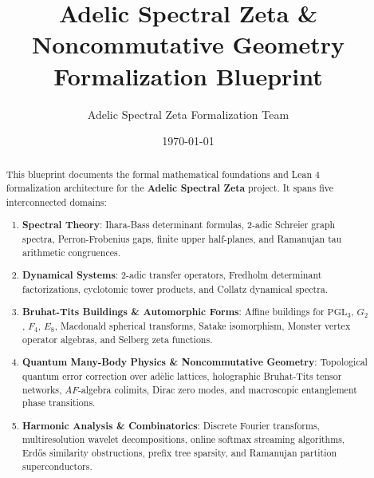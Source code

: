 \documentclass[11pt,a4paper]{report}
\title{Adelic Spectral Zeta \& Noncommutative Geometry \\ \Large Formalization Blueprint}
\author{Adelic Spectral Zeta Formalization Team}
\date{\today}
\begin{document}
\maketitle

\begin{abstract}
This blueprint documents the formal mathematical foundations and Lean 4 formalization architecture for the \textbf{Adelic Spectral Zeta} project. It spans five interconnected domains:
\begin{enumerate}
    \item \textbf{Spectral Theory}: Ihara-Bass determinant formulas, 2-adic Schreier graph spectra, Perron-Frobenius gaps, finite upper half-planes, and Ramanujan tau arithmetic congruences.
    \item \textbf{Dynamical Systems}: 2-adic transfer operators, Fredholm determinant factorizations, cyclotomic tower products, and Collatz dynamical spectra.
    \item \textbf{Bruhat-Tits Buildings \& Automorphic Forms}: Affine buildings for $\mathrm{PGL}_3$, $G_2$, $F_4$, $E_8$, Macdonald spherical transforms, Satake isomorphism, Monster vertex operator algebras, and Selberg zeta functions.
    \item \textbf{Quantum Many-Body Physics \& Noncommutative Geometry}: Topological quantum error correction over adèlic lattices, holographic Bruhat-Tits tensor networks, $AF$-algebra colimits, Dirac zero modes, and macroscopic entanglement phase transitions.
    \item \textbf{Harmonic Analysis \& Combinatorics}: Discrete Fourier transforms, multiresolution wavelet decompositions, online softmax streaming algorithms, Erd\H{o}s similarity obstructions, prefix tree sparsity, and Ramanujan partition superconductors.
\end{enumerate}
\end{abstract}

\tableofcontents






\end{document}
